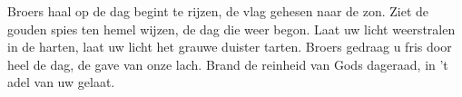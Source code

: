 \beginverse*
Broers haal op de dag begint te rijzen,
de vlag gehesen naar de zon. 
Ziet de gouden spies ten hemel wijzen,
de dag die weer begon. 
Laat uw licht weerstralen in de harten, 
laat uw licht het grauwe duister tarten. 
Broers gedraag u fris door heel de dag,
de gave van onze lach. 
Brand de reinheid van Gods dageraad,
in 't adel van uw gelaat. 
\endverse
\endsong